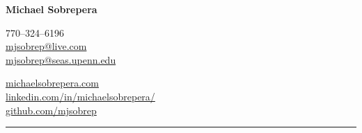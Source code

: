 \begin{center}
    {\LARGE \textbf{Michael Sobrepera}}\\[0cm]
    \begin{minipage}[c]{.35\textwidth}
    770--324--6196\\
    \href{mailto:mjsobrep@live.com}{mjsobrep@live.com}\\
    \href{mailto:mjsobrep@seas.upenn.edu}{mjsobrep@seas.upenn.edu}\\
    \end{minipage}
    \hspace{.28\textwidth}
    \begin{minipage}[r]{.35\textwidth}
    \raggedleft
    \href{http://michaelsobrepera.com}{michaelsobrepera.com}\\
    \href{https://www.linkedin.com/in/michaelsobrepera/}{linkedin.com/in/michaelsobrepera/}\\
    \href{https://github.com/mjsobrep}{github.com/mjsobrep}\\

    \end{minipage}
    \end{center}
    \hrule
    \vspace{0cm}
